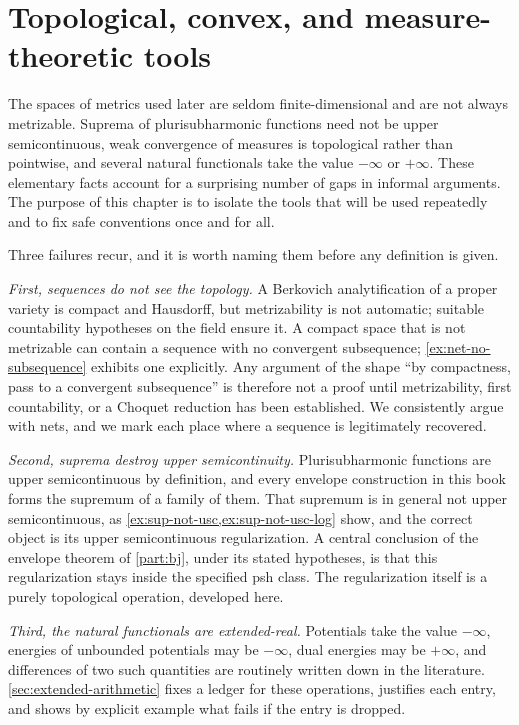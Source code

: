 \chapter{Topological, convex, and measure-theoretic tools}
\label{chap:topological-tools}

The spaces of metrics used later are seldom finite-dimensional and are not
always metrizable.  Suprema of plurisubharmonic functions need not be upper
semicontinuous, weak convergence of measures is topological rather than
pointwise, and several natural functionals take the value $-\infty$ or
$+\infty$.  These elementary facts account for a surprising number of gaps in
informal arguments.  The purpose of this chapter is to isolate the tools that
will be used repeatedly and to fix safe conventions once and for all.

Three failures recur, and it is worth naming them before any definition is
given.

\emph{First, sequences do not see the topology.}  A Berkovich analytification
of a proper variety is compact and Hausdorff, but metrizability is not
automatic; suitable countability hypotheses on the field ensure it.
A compact space
that is not metrizable can contain a sequence with no convergent subsequence;
\cref{ex:net-no-subsequence} exhibits one explicitly.  Any argument of the
shape ``by compactness, pass to a convergent subsequence'' is therefore not a
proof until metrizability, first countability, or a Choquet reduction has been
established.  We consistently argue with nets, and we mark each place where a
sequence is legitimately recovered.

\emph{Second, suprema destroy upper semicontinuity.}  Plurisubharmonic
functions are upper semicontinuous by definition, and every envelope
construction in this book forms the supremum of a family of them.  That
supremum is in general not upper semicontinuous, as
\cref{ex:sup-not-usc,ex:sup-not-usc-log} show, and the correct object is its
upper semicontinuous regularization.  A central conclusion of the envelope
theorem of \cref{part:bj}, under its stated hypotheses, is that this
regularization stays inside the specified psh class.  The regularization
itself is a purely topological operation, developed here.

\emph{Third, the natural functionals are extended-real.}  Potentials take the
value $-\infty$, energies of unbounded potentials may be $-\infty$, dual
energies may be $+\infty$, and differences of two such quantities are
routinely written down in the literature.  \cref{sec:extended-arithmetic}
fixes a ledger for these operations, justifies each entry, and shows by
explicit example what fails if the entry is dropped.

